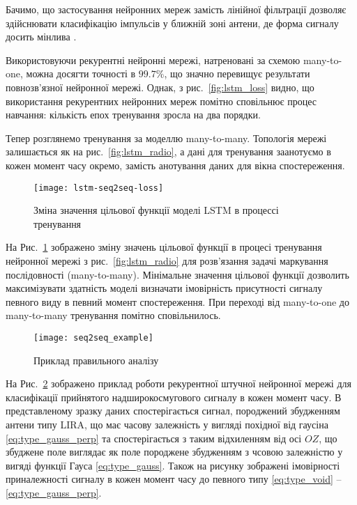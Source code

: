 Бачимо, що застосування нейронних мереж замість лінійної фільтрації 
дозволяє здійснювати класифікацію імпульсів у ближній зоні антени, де 
форма сигналу досить мінлива \cite{my:UWBUSIS2018}.

Використовуючи рекурентні нейронні мережі, натреновані за схемою many-to-one, 
можна досягти точності в $ 99.7\% $, що значно перевищує результати 
повнозв'язної нейронної мережі. Однак, з рис.~\ref{fig:lstm_loss} видно, що 
використання рекурентних нейронних мереж помітно сповільнює процес навчання: 
кількість епох тренування зросла на два порядки.

Тепер розглянемо тренування за моделлю many-to-many. Топологія мережі 
залишається як на рис.~\ref{fig:lstm_radio}, а дані для тренування
заанотуємо в кожен момент часу окремо, замість анотування даних для вікна 
спостереження.

\begin{figure}[htbp] \begin{center}
\texttt{[image: lstm-seq2seq-loss]}
\caption{Зміна значення цільової функції моделі LSTM
в процессі тренування} \label{fig:lstm_seq2seq_loss}
\end{center} \end{figure}

На Рис.~\ref{fig:lstm_seq2seq_loss} зображено зміну значень цільової функції
в процесі тренування нейронної мережі з рис.~\ref{fig:lstm_radio} для 
розв'язання задачі маркування послідовності (many-to-many). Мінімальне значення 
цільової функції дозволить максимізувати здатність моделі визначати
імовірність присутності сигналу певного виду в певний момент спостереження.
При переході від many-to-one до many-to-many тренування помітно сповільнилось.

\begin{figure}[htbp] \begin{center}
\texttt{[image: seq2seq\_example]}
\caption{Приклад правильного аналізу} \label{fig:seq2seq_example}
\end{center} \end{figure}

На Рис.~\ref{fig:seq2seq_example} зображено приклад роботи рекурентної 
штучної нейронної мережі для класифікації прийнятого надширокосмугового сигналу 
в кожен момент часу. В представленому зразку даних спостерігається сигнал,
породжений збудженням антени типу LIRA, що має часову залежність у вигляді 
похідної від гаусіна \eqref{eq:type_gauss_perp} та спостерігається з 
таким відхиленням від осі $ OZ $, що збуджене поле виглядає як поле породжене 
збудженням з чсовою залежністю у вигяді функції Гауса \eqref{eq:type_gauss}. 
Також на рисунку зображені імовірності приналежності сигналу в кожен момент 
часу до певного типу \eqref{eq:type_void} -- \eqref{eq:type_gauss_perp}.

